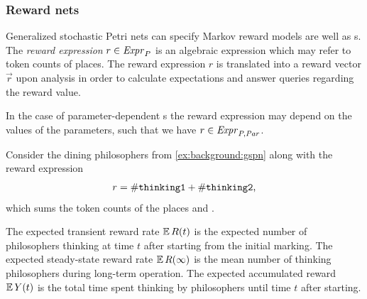 \subsubsection{Reward nets}

Generalized stochastic Petri nets can specify Markov reward models are well as s. The \emph{reward expression} \(r \in \textrm{\itshape Expr\/}_P\) is an algebraic expression which may refer to token counts of places. The reward expression \(r\) is translated into a reward vector \(\vec{r}\) upon analysis in order to calculate expectations and answer queries regarding the reward value.

In the case of parameter-dependent s the reward expression may depend on the values of the parameters, such that we have \(r \in \textrm{\itshape Expr\/}_{P, \textrm{\itshape Par\/}}\).

\begin{runningExample}
  Consider the dining philosophers  from \vref{ex:background:gspn} along with the reward expression
  \begin{equation}
    r = \#\texttt{\upshape thinking1} + \#\texttt{\upshape thinking2} \text,
  \end{equation}
  which sums the token counts of the places  and .

  The expected transient reward rate \(\operatorname{\mathbb{E}} R(t)\) is the expected number of philosophers thinking at time \(t\) after starting from the initial marking. The expected steady-state reward rate \(\operatorname{\mathbb{E}} R(\infty)\) is the mean number of thinking philosophers during long-term operation. The expected accumulated reward \(\operatorname{\mathbb{E}} Y(t)\) is the total time spent thinking by philosophers until time \(t\) after starting.
\end{runningExample}

